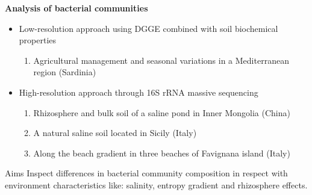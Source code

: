 \documentclass[10pt]{beamer}
\begin{document}
\begin{frame}
	\textbf{\Large{Analysis of bacterial communities}}
	\vspace{5mm}
	
	\begin{itemize}
		\item Low-resolution approach using DGGE combined with soil biochemical properties
		\begin{enumerate}
			\item Agricultural management and seasonal variations in a Mediterranean region (Sardinia)
		\end{enumerate}
		\item High-resolution approach through 16S rRNA massive sequencing
		\begin{enumerate}
			\item Rhizosphere and bulk soil of a saline pond in Inner Mongolia (China)
			\item A natural saline soil located in Sicily (Italy)
			\item Along the beach gradient in three beaches of Favignana island (Italy)		
		\end{enumerate}		
	\end{itemize}
	\vspace{3mm}
	\begin{block}{Aims}
		Inspect differences in bacterial community composition in respect with environment characteristics like: salinity, entropy gradient and rhizosphere effects.
	\end{block}
\end{frame}

\end{document}
